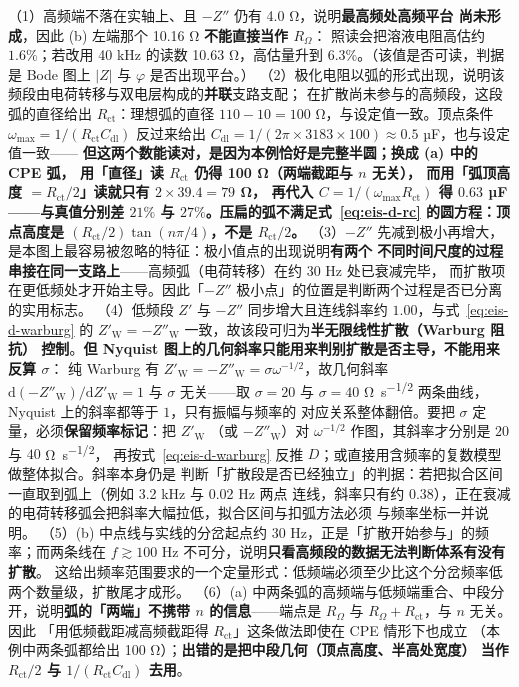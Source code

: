 \begin{infer}
（1）高频端不落在实轴上、且 $-Z''$ 仍有 4.0 \unit{\ohm}，说明\textbf{最高频处高频平台
尚未形成}，因此 (b) 左端那个 10.16 \unit{\ohm} \textbf{不能直接当作 $R_{\Omega}$}：
照读会把溶液电阻高估约 $1.6\%$；若改用 40 kHz 的读数 10.63 \unit{\ohm}，高估量升到
$6.3\%$。（该值是否可读，判据是 Bode 图上 $|Z|$ 与 $\varphi$ 是否出现平台。）
（2）极化电阻以弧的形式出现，说明该频段由电荷转移与双电层构成的\textbf{并联}支路支配；
在扩散尚未参与的高频段，这段弧的直径给出 $R_{\mathrm{ct}}$：理想弧的直径
$110-10=100$ \unit{\ohm}，与设定值一致。顶点条件
$\omega_{\max}=1/(R_{\mathrm{ct}}C_{\mathrm{dl}})$ 反过来给出
$C_{\mathrm{dl}}=1/(2\pi\times3183\times100)\approx0.5$ µF，也与设定值一致——
\textbf{但这两个数能读对，是因为本例恰好是完整半圆；换成 (a) 中的 CPE 弧，
用「直径」读 $R_{\mathrm{ct}}$ 仍得 100 \unit{\ohm}（两端截距与 $n$ 无关），
而用「弧顶高度 $=R_{\mathrm{ct}}/2$」读就只有 $2\times39.4=79$ \unit{\ohm}，
再代入 $C=1/(\omega_{\max}R_{\mathrm{ct}})$ 得 $0.63$ µF——与真值分别差 $21\%$ 与
$27\%$。压扁的弧不满足式~\eqref{eq:eis-d-rc} 的圆方程：顶点高度是
$(R_{\mathrm{ct}}/2)\tan(n\pi/4)$，不是 $R_{\mathrm{ct}}/2$。}
（3）$-Z''$ 先减到极小再增大，是本图上最容易被忽略的特征：极小值点的出现说明\textbf{有两个
不同时间尺度的过程串接在同一支路上}——高频弧（电荷转移）在约 30 Hz 处已衰减完毕，
而扩散项在更低频处才开始主导。因此「$-Z''$ 极小点」的位置是判断两个过程是否已分离的实用标志。
（4）低频段 $Z'$ 与 $-Z''$ 同步增大且连线斜率约 $1.00$，与式~\eqref{eq:eis-d-warburg}
的 $Z'_{\mathrm{W}}=-Z''_{\mathrm{W}}$ 一致，故该段可归为\textbf{半无限线性扩散（Warburg 阻抗）
控制}。\textbf{但 Nyquist 图上的几何斜率只能用来判别扩散是否主导，不能用来反算 $\sigma$}：
纯 Warburg 有 $Z'_{\mathrm{W}}=-Z''_{\mathrm{W}}=\sigma\omega^{-1/2}$，故几何斜率
$\mathrm{d}(-Z''_{\mathrm{W}})/\mathrm{d}Z'_{\mathrm{W}}=1$ 与 $\sigma$ 无关——取 $\sigma=20$
与 $\sigma=40$ \unit{\ohm.s^{-1/2}} 两条曲线，Nyquist 上的斜率都等于 $1$，只有振幅与频率的
对应关系整体翻倍。要把 $\sigma$ 定量，必须\textbf{保留频率标记}：把 $Z'_{\mathrm{W}}$
（或 $-Z''_{\mathrm{W}}$）对 $\omega^{-1/2}$ 作图，其斜率才分别是 $20$ 与 $40$ \unit{\ohm.s^{-1/2}}，
再按式~\eqref{eq:eis-d-warburg} 反推 $D$；或直接用含频率的复数模型做整体拟合。斜率本身仍是
判断「扩散段是否已经独立」的判据：若把拟合区间一直取到弧上（例如 3.2 kHz 与 0.02 Hz 两点
连线，斜率只有约 $0.38$），正在衰减的电荷转移弧会把斜率大幅拉低，拟合区间与扣弧方法必须
与频率坐标一并说明。
（5）(b) 中点线与实线的分岔起点约 30 Hz，正是「扩散开始参与」的频率；而两条线在
$f\gtrsim 100$ Hz 不可分，说明\textbf{只看高频段的数据无法判断体系有没有扩散}。
这给出频率范围要求的一个定量形式：低频端必须至少比这个分岔频率低两个数量级，扩散尾才成形。
（6）(a) 中两条弧的高频端与低频端重合、中段分开，说明\textbf{弧的「两端」不携带
$n$ 的信息}——端点是 $R_{\Omega}$ 与 $R_{\Omega}+R_{\mathrm{ct}}$，与 $n$ 无关。因此
「用低频截距减高频截距得 $R_{\mathrm{ct}}$」这条做法即使在 CPE 情形下也成立
（本例中两条弧都给出 100 \unit{\ohm}）；\textbf{出错的是把中段几何（顶点高度、半高处宽度）
当作 $R_{\mathrm{ct}}/2$ 与 $1/(R_{\mathrm{ct}}C_{\mathrm{dl}})$ 去用}。
\end{infer}

